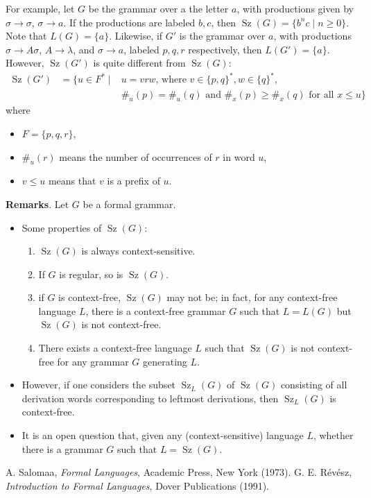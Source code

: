 \documentclass[12pt]{article}
\begin{document}
For example, let $G$ be the grammar over a the letter $a$, with productions given by $\sigma\to \sigma$, $\sigma \to a$.  If the productions are labeled $b,c$, then $\operatorname{Sz}(G)=\lbrace b^n c \mid n\ge 0\rbrace$.  Note that $L(G)=\lbrace a\rbrace$.  Likewise, if $G'$ is the grammar over $a$, with productions $\sigma\to A \sigma$, $A\to \lambda$, and $\sigma\to a$, labeled $p,q,r$ respectively, then $L(G')=\lbrace a\rbrace$.  However, $\operatorname{Sz}(G')$ is quite different from $\operatorname{Sz}(G)$:
\begin{eqnarray*}
\operatorname{Sz}(G')&=\lbrace u\in F^*  \mid& u=vrw\mbox{, where }v\in \lbrace p,q\rbrace^*, w\in \lbrace q\rbrace^*, \\
&& \#_u(p)=\#_u(q)\mbox{ and }\#_x(p)\ge \#_x(q)\mbox{ for all }x\le u\rbrace
\end{eqnarray*}
where 
\begin{itemize}
\item $F=\lbrace p,q,r\rbrace$,
\item $\#_u(r)$ means the number of occurrences of $r$ in word $u$,
\item $v\le u$ means that $v$ is a prefix of $u$.
\end{itemize}

\textbf{Remarks}.  Let $G$ be a formal grammar.
\begin{itemize}
\item
Some properties of $\operatorname{Sz}(G)$:
\begin{enumerate}
\item $\operatorname{Sz}(G)$ is always context-sensitive.
\item If $G$ is regular, so is $\operatorname{Sz}(G)$.
\item if $G$ is context-free, $\operatorname{Sz}(G)$ may not be; in fact, for any context-free language $L$, there is a context-free grammar $G$ such that $L=L(G)$ but $\operatorname{Sz}(G)$ is not context-free.
\item There exists a context-free language $L$ such that $\operatorname{Sz}(G)$ is not context-free for any grammar $G$ generating $L$.
\end{enumerate}
\item
However, if one considers the subset $\operatorname{Sz}_L(G)$ of $\operatorname{Sz}(G)$ consisting of all derivation words corresponding to leftmost derivations, then $\operatorname{Sz}_L(G)$ is context-free.
\item
It is an open question that, given any (context-sensitive) language $L$, whether there is a grammar $G$ such that $L=\operatorname{Sz}(G)$.
\end{itemize}

\begin{thebibliography}{9}
 A. Salomaa, {\em Formal Languages}, Academic Press, New York (1973).
 G. E. R\'{e}v\'{e}sz, {\em Introduction to Formal Languages}, Dover Publications (1991).
\end{thebibliography}
\end{document}
